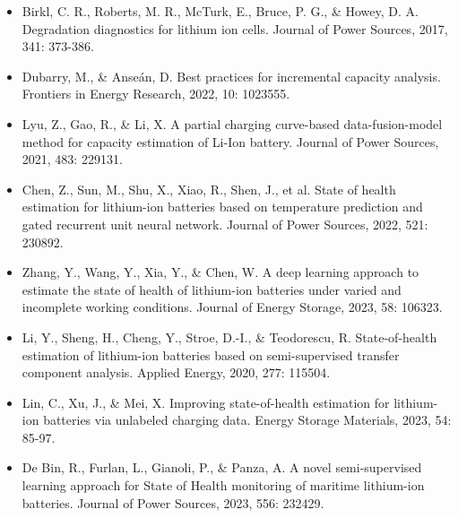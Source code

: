 \documentclass[12pt, a4paper]{ctexart}
\begin{document}
\begin{itemize}
  \item  Birkl, C. R., Roberts, M. R., McTurk, E., Bruce, P. G., \& Howey, D. A. Degradation diagnostics for lithium ion cells. Journal of Power Sources, 2017, 341: 373-386.
\end{itemize}
\begin{itemize}
  \item  Dubarry, M., \& Anseán, D. Best practices for incremental capacity analysis. Frontiers in Energy Research, 2022, 10: 1023555.
\end{itemize}
\begin{itemize}
  \item  Lyu, Z., Gao, R., \& Li, X. A partial charging curve-based data-fusion-model method for capacity estimation of Li-Ion battery. Journal of Power Sources, 2021, 483: 229131.
\end{itemize}
\begin{itemize}
  \item  Chen, Z., Sun, M., Shu, X., Xiao, R., Shen, J., et al. State of health estimation for lithium-ion batteries based on temperature prediction and gated recurrent unit neural network. Journal of Power Sources, 2022, 521: 230892.
\end{itemize}
\begin{itemize}
  \item  Zhang, Y., Wang, Y., Xia, Y., \& Chen, W. A deep learning approach to estimate the state of health of lithium-ion batteries under varied and incomplete working conditions. Journal of Energy Storage, 2023, 58: 106323.
\end{itemize}
\begin{itemize}
  \item  Li, Y., Sheng, H., Cheng, Y., Stroe, D.-I., \& Teodorescu, R. State-of-health estimation of lithium-ion batteries based on semi-supervised transfer component analysis. Applied Energy, 2020, 277: 115504.
\end{itemize}
\begin{itemize}
  \item  Lin, C., Xu, J., \& Mei, X. Improving state-of-health estimation for lithium-ion batteries via unlabeled charging data. Energy Storage Materials, 2023, 54: 85-97.
\end{itemize}
\begin{itemize}
  \item  De Bin, R., Furlan, L., Gianoli, P., \& Panza, A. A novel semi-supervised learning approach for State of Health monitoring of maritime lithium-ion batteries. Journal of Power Sources, 2023, 556: 232429.
\end{itemize}
\end{document}
